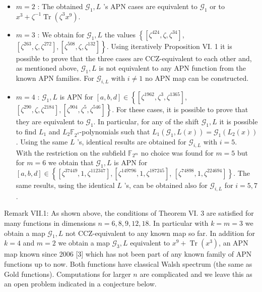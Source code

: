 \documentclass[10pt]{article}
\begin{document}
\begin{itemize}
  \item $m=2$ : The obtained $\mathcal{G}_{1}, L$ 's APN cases are equivalent to $\mathcal{G}_{1}$ or to $x^{3}+\zeta^{-1} \operatorname{Tr}\left(\zeta^{3} x^{9}\right)$.
  \item $m=3$ : We obtain for $\mathcal{G}_{1}, L$ the values $\left\{\left[\zeta^{424}, \zeta, \zeta^{34}\right]\right.$, $\left.\left[\zeta^{263}, \zeta, \zeta^{272}\right],\left[\zeta^{508}, \zeta, \zeta^{132}\right]\right\}$. Using iteratively Proposition VI. 1 it is possible to prove that the three cases are CCZ-equivalent to each other and, as mentioned above, $\mathcal{G}_{1}, L$ is not equivalent to any APN function from the known APN families. For $\mathcal{G}_{i, L}$ with $i \neq 1$ no APN map can be constructed.
  \item $m=4$ : $\mathcal{G}_{1}, L$ is APN for $[a, b, d] \in\left\{\left[\zeta^{1962}, \zeta^{3}, \zeta^{1365}\right]\right.$, $\left.\left[\zeta^{290}, \zeta, \zeta^{2184}\right],\left[\zeta^{904}, \zeta^{5}, \zeta^{546}\right]\right\}$. For these cases, it is possible to prove that they are equivalent to $\mathcal{G}_{1}$. In particular, for any of the shift $\mathcal{G}_{1}, L$ it is possible to find $L_{1}$ and $L_{2} \mathbb{F}_{2^{4}}$-polynomials such that $L_{1}\left(\mathcal{G}_{1}, L(x)\right)= \mathcal{G}_{1}\left(L_{2}(x)\right)$. Using the same $L$ 's, identical results are obtained for $\mathcal{G}_{i, L}$ with $i=5$.\\
With the restriction on the subfield $\mathbb{F}_{2^{m}}$ no choice was found for $m=5$ but for $m=6$ we obtain that $\mathcal{G}_{1}, L$ is APN for $[a, b, d] \in\left\{\left[\zeta^{37449}, 1, \zeta^{112347}\right],\left[\zeta^{149796}, 1, \zeta^{187245}\right]\right.$, $\left.\left[\zeta^{74898}, 1, \zeta^{224694}\right]\right\}$. The same results, using the identical $L$ 's, can be obtained also for $\mathcal{G}_{i, L}$ for $i=5,7$.
\end{itemize}

Remark VII.1: As shown above, the conditions of Theorem VI. 3 are satisfied for many functions in dimensions $n=6,8,9,12,18$. In particular with $k=m=3$ we obtain a map $\mathcal{G}_{1}, L$ not CCZ-equivalent to any known map so far. In addition for $k=4$ and $m=2$ we obtain a map $\mathcal{G}_{3}, L$ equivalent to $x^{9}+\operatorname{Tr}\left(x^{3}\right)$, an APN map known since 2006 [3] which has not been part of any known family of APN functions up to now. Both functions have classical Walsh spectrum (the same as Gold functions). Computations for larger $n$ are complicated and we leave this as an open problem indicated in a conjecture below.
\end{document}
